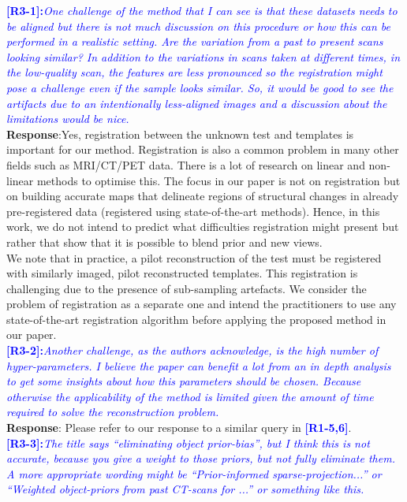 \documentclass{article}
\begin{document}
\textcolor{blue}{\textbf{[R3-1]:}\textit{One challenge of the method that I can see is that these datasets needs to be aligned but there is not much discussion on this procedure or how this can be performed in a realistic setting. Are the variation from a past to present scans looking similar? In addition to the variations in scans taken at different times, in the low-quality scan, the features are less pronounced so the registration might pose a challenge even if the sample looks similar. So, it would be good to see the artifacts due to an intentionally less-aligned images and a discussion about the limitations would be nice.
}}\\

\textbf{Response}:Yes, registration between the unknown test and templates is important for our method. Registration is also a common problem in many other fields such as MRI/CT/PET data.  There is a lot of research on linear and non-linear methods to optimise this. The focus in our paper is not on registration but on building accurate maps that delineate regions of structural changes in already pre-registered data (registered using state-of-the-art methods).  Hence, in this work, we do not intend to predict what difficulties registration might present but rather that show that it is possible to blend prior and new views.\\

We note that in practice, a pilot reconstruction of the test must be registered with similarly imaged, pilot reconstructed templates. This registration is challenging due to the presence of sub-sampling artefacts. We consider the problem of registration as a separate one and intend the practitioners to use any state-of-the-art registration algorithm before applying the proposed method in our paper. 
\\

\textcolor{blue}{\textbf{[R3-2]:}\textit{Another challenge, as the authors acknowledge, is the high number of hyper-parameters. I believe the paper can benefit a lot from an in depth analysis to get some insights about how this parameters should be chosen. Because otherwise the applicability of the method is limited given the amount of time required to solve the reconstruction problem.
}}\\

\textbf{Response}: Please refer to our response to a similar query in \textcolor{blue}{\textbf{[R1-5,6]}}.\\


\textcolor{blue}{\textbf{[R3-3]:}\textit{The title says ``eliminating object prior-bias'', but I think this is not accurate, because you give a weight to those priors, but not fully eliminate them. A more appropriate wording might be ``Prior-informed sparse-projection...'' or ``Weighted object-priors from past CT-scans for ...'' or something like this.}}\\
\end{document}
